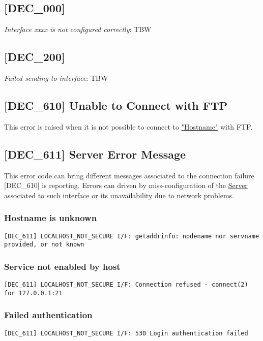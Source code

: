 \documentclass[dec_sum_main.tex]{subfiles}
\begin{document}
\subsection{[DEC\_000]}
\textit{Interface xxxx is not configured correctly}: TBW

\subsection{[DEC\_200]}
\textit{Failed sending  to interface}: TBW

\subsection{[DEC\_610] Unable to Connect with FTP}
This error is raised when it is not possible to connect to \hyperref[Config_Server]{"Hostname"} with FTP.

\subsection{[DEC\_611] Server Error Message}
This error code can bring different messages associated to the connection failure [DEC\_610] is reporting. Errors can driven by miss-configuration of the \hyperref[Config_Server]{Server} associated to such interface or its unavailability due to network problems.

\subsubsection{Hostname is unknown}
\begin{verbatim}
[DEC_611] LOCALHOST_NOT_SECURE I/F: getaddrinfo: nodename nor servname provided, or not known
\end{verbatim}

\subsubsection{Service not enabled by host}
\begin{verbatim}
[DEC_611] LOCALHOST_NOT_SECURE I/F: Connection refused - connect(2) for 127.0.0.1:21
\end{verbatim}

\subsubsection{Failed authentication}
\begin{verbatim}
[DEC_611] LOCALHOST_NOT_SECURE I/F: 530 Login authentication failed
\end{verbatim}
\end{document}
